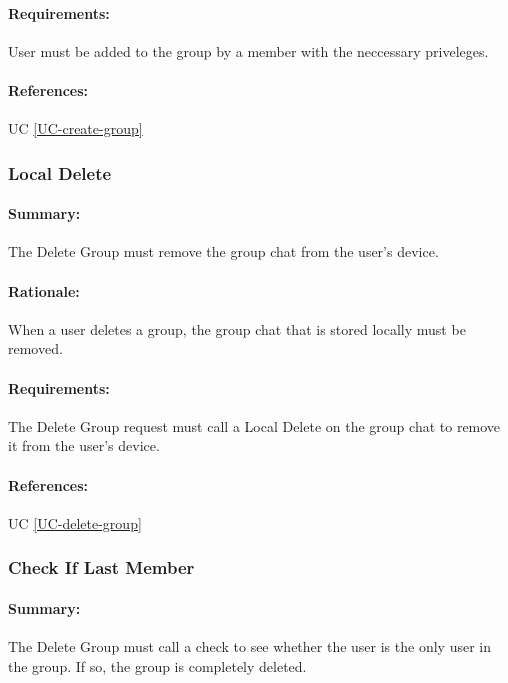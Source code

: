 \documentclass[11pt]{article}
\begin{document}
\paragraph{Requirements:} User must be added to the group by a member with the neccessary priveleges.
\paragraph{References:} UC \ref{UC-create-group}
 
 \subsubsection{Local Delete} \label{FR-Local-Delete}
 \paragraph{Summary:} The Delete Group must remove the group chat from the user's device.
 \paragraph{Rationale:} When a user deletes a group, the group chat that is stored locally must be removed.
 \paragraph{Requirements:} The Delete Group request must call a Local Delete on the group chat to remove it from the user's device.
 \paragraph{References:} UC \ref{UC-delete-group}
 
\subsubsection{Check If Last Member} \label{FR-Check-Last-User}
\paragraph{Summary:} The Delete Group must call a check to see whether the user is the only user in the group. If so, the group is completely deleted.
\end{document}
